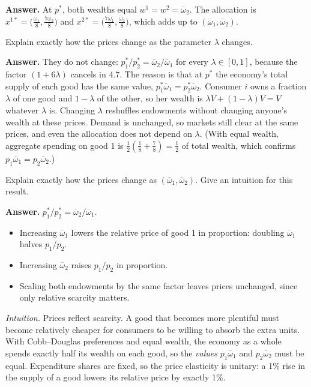 \documentclass[11pt]{article}
\newcommand{\bw}{\overline{\omega}}
\newenvironment{solution}{\par\smallskip\noindent\textbf{Answer.} }{\par\medskip}
\begin{document}
\begin{description}
\begin{solution}
At $p^*$, both wealths equal $w^1=w^2=\bw_2$. The allocation is $x^{1*}=\big(\tfrac{\bw_1}{8},\tfrac{7\bw_2}{8}\big)$ and $x^{2*}=\big(\tfrac{7\bw_1}{8},\tfrac{\bw_2}{8}\big)$, which adds up to $(\bw_1,\bw_2)$.
\end{solution}

\item[4.8] Explain exactly how the prices change as the parameter $\lambda$ changes.
\begin{solution}
They do not change: $p_1^*/p_2^*=\bw_2/\bw_1$ for every $\lambda\in[0,1]$, because the factor $(1+6\lambda)$ cancels in 4.7. The reason is that at $p^*$ the economy's total supply of each good has the same value, $p_1^*\bw_1=p_2^*\bw_2$. Consumer $i$ owns a fraction $\lambda$ of one good and $1-\lambda$ of the other, so her wealth is $\lambda V+(1-\lambda)V=V$ whatever $\lambda$ is. Changing $\lambda$ reshuffles endowments without changing anyone's wealth at these prices. Demand is unchanged, so markets still clear at the same prices, and even the allocation does not depend on $\lambda$. (With equal wealth, aggregate spending on good 1 is $\tfrac12(\tfrac18+\tfrac78)=\tfrac12$ of total wealth, which confirms $p_1\bw_1=p_2\bw_2$.)
\end{solution}

\item[4.9] Explain exactly how the prices change as $(\bw_1,\bw_2)$. Give an intuition for this result.
\begin{solution}
$p_1^*/p_2^*=\bw_2/\bw_1$.
\begin{itemize}[itemsep=0pt]
\item Increasing $\bw_1$ lowers the relative price of good 1 in proportion: doubling $\bw_1$ halves $p_1/p_2$.
\item Increasing $\bw_2$ raises $p_1/p_2$ in proportion.
\item Scaling both endowments by the same factor leaves prices unchanged, since only relative scarcity matters.
\end{itemize}
\emph{Intuition.} Prices reflect scarcity. A good that becomes more plentiful must become relatively cheaper for consumers to be willing to absorb the extra units. With Cobb--Douglas preferences and equal wealth, the economy as a whole spends exactly half its wealth on each good, so the \emph{values} $p_1\bw_1$ and $p_2\bw_2$ must be equal. Expenditure shares are fixed, so the price elasticity is unitary: a 1\% rise in the supply of a good lowers its relative price by exactly 1\%.
\end{solution}
\end{description}
\end{document}
